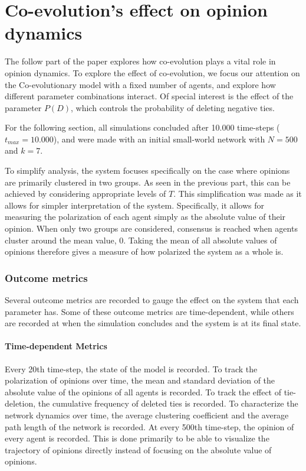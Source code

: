 \documentclass[11pt]{article}
\begin{document}
\part{Co-evolution's effect on opinion dynamics}

The follow part of the paper explores how co-evolution plays a vital role in opinion dynamics. To explore the effect of co-evolution, we focus our attention on the Co-evolutionary model with a fixed number of agents, and explore how different parameter combinations interact. Of special interest is the effect of the parameter $P(D)$, which controls the probability of deleting negative ties. 

\noindent For the following section, all simulations concluded after 10.000 time-steps ($t_{max} = 10.000$), and were made with an initial small-world network with $N=500$ and $k=7$. 

\noindent To simplify analysis, the system focuses specifically on the case where opinions are primarily clustered in two groups. As seen in the previous part, this can be achieved by considering appropriate levels of $T$. This simplification was made as it allows for simpler interpretation of the system. Specifically, it allows for measuring the polarization of each agent simply as the absolute value of their opinion. When only two groups are considered, consensus is reached when agents cluster around the mean value, 0. Taking the mean of all absolute values of opinions therefore gives a measure of how polarized the system as a whole is. 

\section{Outcome metrics} 
Several outcome metrics are recorded to gauge the effect on the system that each parameter has. Some of these outcome metrics are time-dependent, while others are recorded at when the simulation concludes and the system is at its final state. 

\subsection{Time-dependent Metrics}
Every 20th time-step, the state of the model is recorded. 
To track the polarization of opinions over time, the mean and standard deviation of the absolute value of the opinions of all agents is recorded.
To track the effect of tie-deletion, the cumulative frequency of deleted ties is recorded.
To characterize the network dynamics over time, the average clustering coefficient and the average path length of the network is recorded.
At every 500th time-step, the opinion of every agent is recorded. This is done primarily to be able to visualize the trajectory of opinions directly instead of focusing on the absolute value of opinions. 
\end{document}
